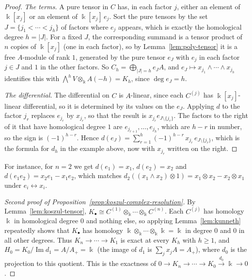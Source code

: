 \begin{advanced}
\begin{proof}
\emph{The terms.}
A pure tensor in $C$ has, in each factor $j$, either an element of $\Bbbk[x_j]$ or an element of $\Bbbk[x_j]\,e_j$.
Sort the pure tensors by the set $J=\{j_1<\cdots<j_h\}$ of factors where $e_j$ appears, which is exactly the homological degree $h=|J|$.
For a fixed $J$, the corresponding summand is a tensor product of $n$ copies of $\Bbbk[x_j]$ (one in each factor), so by Lemma~\ref{lem:poly-tensor} it is a free $A$-module of rank $1$, generated by the pure tensor $e_J$ with $e_j$ in each factor $j\in J$ and $1$ in the other factors.
So $C_h=\bigoplus_{|J|=h}e_JA$, and $e_J\mapsto x_{j_1}\wedge\cdots\wedge x_{j_h}$ identifies this with $\bigwedge^hV\otimes_\Bbbk A(-h)=K_h$, since $\deg e_J=h$.

\emph{The differential.}
The differential on $C$ is $A$-linear, since each $C^{(j)}$ has $\Bbbk[x_j]$-linear differential, so it is determined by its values on the $e_J$.
Applying $d$ to the factor $j_r$ replaces $e_{j_r}$ by $x_{j_r}$, so that the result is $x_{j_r}e_{J\setminus\{j_r\}}$.
The factors to the right of it that have homological degree $1$ are $e_{j_{r+1}},\ldots,e_{j_h}$, which are $h-r$ in number, so the sign is $(-1)^{h-r}$.
Hence $d(e_J)=\sum_{r=1}^h(-1)^{h-r}\,x_{j_r}\,e_{J\setminus\{j_r\}}$, which is the formula for $d_h$ in the example above, now with $x_{j_r}$ written on the right.
\end{proof}

For instance, for $n=2$ we get $d(e_1)=x_1$, $d(e_2)=x_2$ and $d(e_1e_2)=x_2e_1-x_1e_2$, which matches $d_2((x_1\wedge x_2)\otimes1)=x_1\otimes x_2-x_2\otimes x_1$ under $e_i\leftrightarrow x_i$.

\begin{proof}[Second proof of Proposition~\ref{prop:koszul-complex-resolution}]
By Lemma~\ref{lem:koszul-tensor}, $K_\bullet\cong C^{(1)}\otimes_\Bbbk\cdots\otimes_\Bbbk C^{(n)}$.
Each $C^{(j)}$ has homology $\Bbbk$ in homological degree $0$ and nothing else, so applying Lemma~\ref{lem:kunneth} repeatedly shows that $K_\bullet$ has homology $\Bbbk\otimes_\Bbbk\cdots\otimes_\Bbbk\Bbbk=\Bbbk$ in degree $0$ and $0$ in all other degrees.
Thus $K_n\to\cdots\to K_1$ is exact at every $K_h$ with $h\geq1$, and $H_0=K_0/\operatorname{Im}d_1=A/A_+=\Bbbk$ (the image of $d_1$ is $\sum_jx_jA=A_+$), where $d_0$ is the projection to this quotient.
This is the exactness of $0\to K_n\to\cdots\to K_0\xrightarrow{d_0}\Bbbk\to0$.
\end{proof}
\end{advanced}

